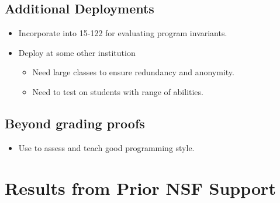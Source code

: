 \documentclass[12pt]{article}
\begin{document}
\subsection{Additional Deployments}

\begin{itemize}
\item Incorporate into 15-122 for evaluating program invariants.  
\item Deploy at some other institution
\begin{itemize}
\item Need large classes to ensure redundancy and anonymity.
\item Need to test on students with range of abilities.
\end{itemize}
\end{itemize}

\subsection{Beyond grading proofs}

\begin{itemize}
\item Use to assess and teach good programming style.
\end{itemize}

\section{Results from Prior NSF Support}

\newpage


\end{document}
